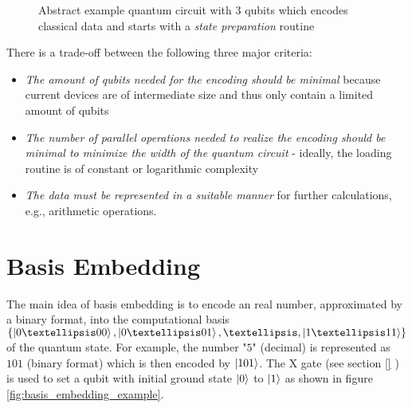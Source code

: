 \begin{figure}[!h]
    \centering
    \caption{Abstract example quantum circuit with 3 qubits which encodes classical data and starts with a \textit{state preparation} routine}
    \label{fig:circuit_state_preparation}
\end{figure}

There is a trade-off between the following three major criteria\cite{Weigold2021_ExpandingDataEncodingPatterns}:
\begin{itemize}
    \item \textit{The amount of qubits needed for the encoding should be minimal} because current devices are of intermediate size and thus only contain a limited amount of qubits
    \item \textit{The number of parallel operations needed to realize the encoding should be minimal to minimize the width of the quantum circuit} - ideally, the loading routine is of constant or logarithmic complexity
    \item \textit{The data must be represented in a suitable manner} for further calculations, e.g., arithmetic operations.
\end{itemize}

\section{Basis Embedding}\label{section:basis_embedding}

The main idea of basis embedding is to encode an real number, approximated by a binary format, into the computational basis $\{\ket{0…00}, \ket{0…01}, …, \ket{1…11}\}$ of the quantum state. For example, the number "$5$" (decimal) is represented as $101$ (binary format) which is then encoded by $\ket{101}$\cite{Weigold2021_EncodingPatternsForQuantumAlgorithms,schuld2021supervised}. The $\mathrm{X}$ gate (see section \ref{} ) is used to set a qubit with initial ground state $\ket{0}$ to $\ket{1}$ as shown in figure \ref{fig:basis_embedding_example}.


